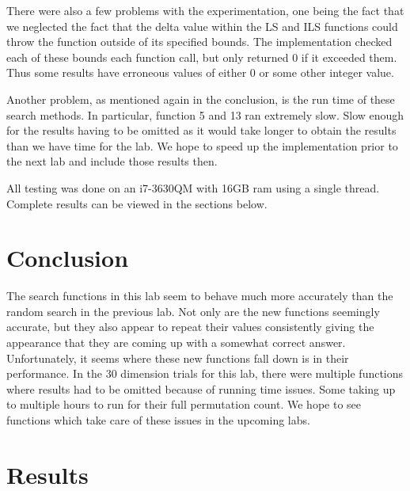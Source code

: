 \documentclass[paper=a4, fontsize=11pt]{scrartcl}
\numberwithin{equation}{section}
\numberwithin{figure}{section}
\numberwithin{table}{section}
\begin{document}
There were also a few problems with the experimentation, one being the fact that
we neglected the fact that the delta value within the LS and ILS functions could
throw the function outside of its specified bounds. The implementation checked
each of these bounds each function call, but only returned 0 if it exceeded them.
Thus some results have erroneous values of either 0 or some other integer value.

Another problem, as mentioned again in the conclusion, is the run time of these
search methods. In particular, function 5 and 13 ran extremely slow. Slow enough
for the results having to be omitted as it would take longer to obtain the results
than we have time for the lab. We hope to speed up the implementation prior to the
next lab and include those results then.

All testing was done on an i7-3630QM with 16GB ram using a single thread.
Complete results can be viewed in the sections below.

\section{Conclusion}
The search functions in this lab seem to behave much more accurately than the
random search in the previous lab. Not only are the new functions seemingly accurate,
but they also appear to repeat their values consistently giving the appearance that
they are coming up with a somewhat correct answer. Unfortunately, it seems where these
new functions fall down is in their performance. In the 30 dimension trials for this lab,
there were multiple functions where results had to be omitted because of running time issues.
Some taking up to multiple hours to run for their full permutation count. We hope to see
functions which take care of these issues in the upcoming labs.

\section{Results}
\end{document}
